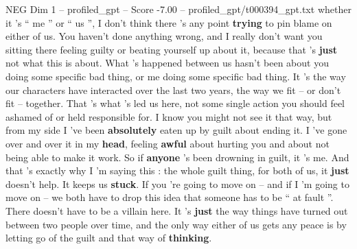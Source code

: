 \begin{textsample}{NEG Dim 1 – profiled\_gpt – Score -7.00 – profiled\_gpt/t000394\_gpt.txt}  \label{ex:f1_neg_018}
whether it ’s “ me ” or “ us ”, I don't think there ’s any point \textbf{trying} to pin blame on either of us.
You haven't done anything wrong, and I really don't want you sitting there feeling guilty or beating yourself up about it, because that ’s \textbf{just} not what this is about.
What ’s happened between us hasn't been about you doing some specific bad thing, or me doing some specific bad thing.
It ’s the way our characters have interacted over the last two years, the way we fit – or don't fit – together.
That ’s what ’s led us here, not some single action you should feel ashamed of or held responsible for.
I know you might not see it that way, but from my side I ’ve been \textbf{absolutely} eaten up by guilt about ending it.
I ’ve gone over and over it in my \textbf{head}, feeling \textbf{awful} about hurting you and about not being able to make it work.
So if \textbf{anyone} ’s been drowning in guilt, it ’s me.
And that ’s exactly why I ’m saying this : the whole guilt thing, for both of us, it \textbf{just} doesn't help.
It keeps us \textbf{stuck}.
If you ’re going to move on – and if I ’m going to move on – we both have to drop this idea that someone has to be “ at fault ”.
There doesn't have to be a villain here.
It ’s \textbf{just} the way things have turned out between two people over time, and the only way either of us gets any peace is by letting go of the guilt and that way of \textbf{thinking}.

\end{textsample}
